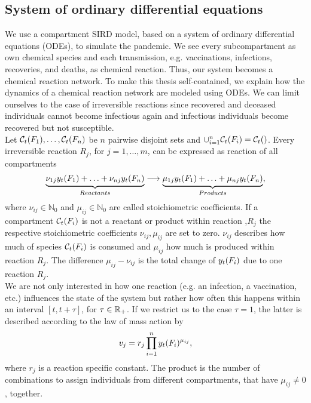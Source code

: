 \subsection{System of ordinary differential equations}
We use a compartment SIRD model, based on a system of ordinary differential equations (ODEs), to simulate the pandemic. We see every subcompartment as own chemical species and each transmission, e.g. vaccinations, infections, recoveries, and deaths, as chemical reaction. Thus, our system becomes a chemical reaction network. To make this thesis self-contained, we explain how the dynamics of a chemical reaction network are modeled using ODEs. We can limit ourselves to the case of irreversible reactions since recovered and deceased individuals cannot become infectious again and infectious individuals become recovered but not susceptible. \\

Let $\mathcal{C}_t(F_1), \dots, \mathcal{C}_t(F_n)$ be $n$ pairwise disjoint sets and $\cup_{i=1}^n \mathcal{C}_t(F_i) = \mathcal{C}_t()$. Every irreversible reaction $R_j$, for $j = 1, \dots, m$, can be expressed as reaction of all compartments
\begin{align}
\underbrace{\nu_{1j} y_t(F_1) + \hdots + \nu_{nj} y_t(F_n)}_{Reactants} \longrightarrow \underbrace{\mu_{1j} y_t(F_1) + \hdots + \mu_{nj} y_t(F_n)}_{Products},
\end{align}
where $\nu_{ij} \in \mathbb{N}_0$ and $\mu_{ij} \in \mathbb{N}_0$ are called stoichiometric coefficients.  If a compartment $\mathcal{C}_t(F_i)$ is not a reactant or product within reaction ,$R_j$ the respective stoichiometric coefficients $\nu_{ij}, \mu_{ij}$ are set to zero. $\nu_{ij}$ describes how much of species $\mathcal{C}_t(F_i)$ is consumed and $\mu_{ij}$ how much is produced within reaction $R_j$. The difference $\mu_{ij} - \nu_{ij}$ is the total change of $y_t(F_i)$ due to one reaction $R_j$.\\

We are not only interested in how one reaction (e.g. an infection, a vaccination, etc.) influences the state of the system but rather how often this happens within an interval $[t, t+\tau]$, for $\tau \in \mathbb{R}_+$. If we restrict us to the case $\tau = 1$, the latter is described according to the law of mass action by
\begin{align}
\label{eq:change_one_unit}
v_j = r_j  \prod_{i=1}^n y_t(F_i)^{\mu_{ij}},
\end{align}
where $r_j$ is a reaction specific constant. The product is the number of combinations to assign individuals from different compartments, that have $\mu_{ij} \neq 0$, together.

